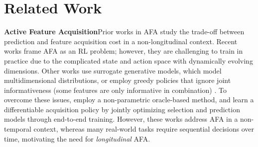 \section{Related Work}

\textbf{Active Feature Acquisition}\quad Prior works in AFA \citep{saar2009active, sheng2006feature} study the trade-off between prediction and feature acquisition cost in a non-longitudinal context. Recent works \citep{shim2018joint, yin2020reinforcement, janisch2020classification} frame AFA as an RL problem; however, they are challenging to train in practice due to the complicated state and action space with dynamically evolving dimensions. Other works \citep{li2021active} use surrogate generative models, which model multidimensional distributions, or employ greedy policies that ignore joint informativeness (some features are only informative in combination) \citep{covert2023learning, ma2018eddi, gong2019icebreaker}. To overcome these issues, \citet{valancius2024acquisition} employ a non-parametric oracle-based method, and  \citet{ghosh2023difa} learn a differentiable acquisition policy by jointly optimizing selection and prediction models through end-to-end training. However, these works address AFA in a non-temporal context, whereas many real-world tasks require sequential decisions over time, motivating the need for \emph{longitudinal} AFA.



